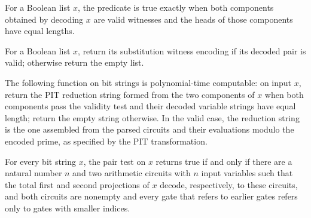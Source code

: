 \begin{definition}
\label{Randomized.pitPairOk}
\leanok
{}
For a Boolean list $x$, the predicate is true exactly when both components obtained by
decoding $x$ are valid witnesses and the heads of those components have equal lengths.
\end{definition}

\begin{definition}
\label{Randomized.pitToZerop}
\leanok
{}
For a Boolean list $x$, return its substitution witness encoding if its decoded pair is
valid; otherwise return the empty list.
\end{definition}

\begin{theorem}
\label{Randomized.polyTimeComputable_pitToZerop}
\leanok
{}
The following function on bit strings is polynomial-time computable: on input $x$,
return the PIT reduction string formed from the two components of $x$ when both
components pass the validity test and their decoded variable strings have equal length;
return the empty string otherwise. In the valid case, the reduction string is the one
assembled from the parsed circuits and their evaluations modulo the encoded prime, as
specified by the PIT transformation.
\end{theorem}

\begin{theorem}
\label{Randomized.pitPairOk_iff}
\leanok
{}
For every bit string $x$, the pair test on $x$ returns true if and only if there are a
natural number $n$ and two arithmetic circuits with $n$ input variables such that the
total first and second projections of $x$ decode, respectively, to these circuits, and
both circuits are nonempty and every gate that refers to earlier gates refers only to
gates with smaller indices.
\end{theorem}

